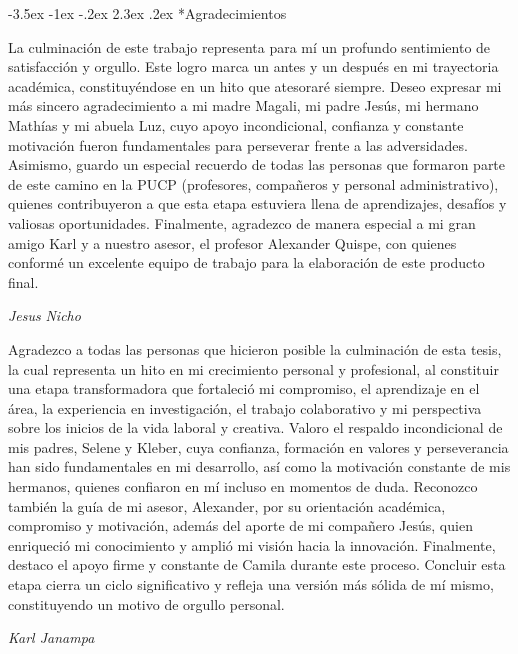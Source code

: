 \documentclass[12pt,a4paper]{article}
\makeatletter
\renewcommand\section{\@startsection{section}{1}{\z@}%
  {-3.5ex \@plus -1ex \@minus -.2ex}%
  {2.3ex \@plus.2ex}%
  {\normalfont\normalsize}}
\makeatother
\begin{document}
\begin{singlespacing}
\section*{\centering\normalfont Agradecimientos}

La culminación de este trabajo representa para mí un profundo sentimiento de satisfacción y orgullo. Este logro marca un antes y un después en mi trayectoria académica, constituyéndose en un hito que atesoraré siempre. Deseo expresar mi más sincero agradecimiento a mi madre Magali, mi padre Jesús, mi hermano Mathías y mi abuela Luz, cuyo apoyo incondicional, confianza y constante motivación fueron fundamentales para perseverar frente a las adversidades. Asimismo, guardo un especial recuerdo de todas las personas que formaron parte de este camino en la PUCP (profesores, compañeros y personal administrativo), quienes contribuyeron a que esta etapa estuviera llena de aprendizajes, desafíos y valiosas oportunidades. Finalmente, agradezco de manera especial a mi gran amigo Karl y a nuestro asesor, el profesor Alexander Quispe, con quienes conformé un excelente equipo de trabajo para la elaboración de este producto final.

\vspace{\baselineskip}

\textit{Jesus}\textit{ Nicho}

\vspace{\baselineskip}

Agradezco a todas las personas que hicieron posible la culminación de esta tesis, la cual representa un hito en mi crecimiento personal y profesional, al constituir una etapa transformadora que fortaleció mi compromiso, el aprendizaje en el área, la experiencia en investigación, el trabajo colaborativo y mi perspectiva sobre los inicios de la vida laboral y creativa. Valoro el respaldo incondicional de mis padres, Selene y Kleber, cuya confianza, formación en valores y perseverancia han sido fundamentales en mi desarrollo, así como la motivación constante de mis hermanos, quienes confiaron en mí incluso en momentos de duda. Reconozco también la guía de mi asesor, Alexander, por su orientación académica, compromiso y motivación, además del aporte de mi compañero Jesús, quien enriqueció mi conocimiento y amplió mi visión hacia la innovación. Finalmente, destaco el apoyo firme y constante de Camila durante este proceso. Concluir esta etapa cierra un ciclo significativo y refleja una versión más sólida de mí mismo, constituyendo un motivo de orgullo personal.

\vspace{\baselineskip}

\textit{Karl Janampa}

\end{singlespacing}
\clearpage
\end{document}
